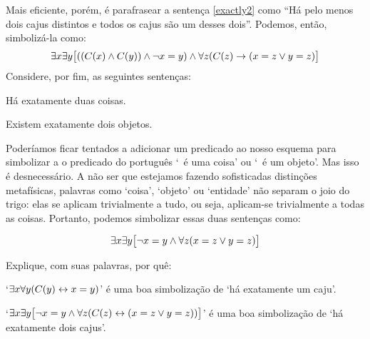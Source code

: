\normalsize
Mais eficiente, porém, é parafrasear a sentença \ref{exactly2} como
``Há pelo menos dois cajus distintos e todos os cajus são um desses dois''.
Podemos, então, simbolizá-la como:
$$\exists x\exists y\bigl[((\mathord{C}(x) \wedge \mathord{C}(y)) \wedge \neg x = y) \wedge \forall z(\mathord{C}(z) \rightarrow ( x= z \vee y = z)\bigr]$$
Considere, por fim, as seguintes sentenças:
\begin{earg}
\item[\ex{exactly2things}] Há exatamente duas coisas.
\item[\ex{exactly2objects}] Existem exatamente dois objetos.
\end{earg}
Poderíamos ficar tentados a adicionar um predicado ao nosso esquema para simbolizar a o predicado do português `\blank\ é uma coisa' ou `\blank\ é um objeto'.
Mas isso é desnecessário.
A não ser que estejamos fazendo sofisticadas distinções metafísicas, palavras 
como `coisa', `objeto' ou `entidade' não separam o joio do trigo:
elas se aplicam trivialmente a tudo, ou seja, aplicam-se trivialmente a todas as coisas.
Portanto, podemos simbolizar essas duas sentenças como:

$$\exists x \exists y \bigl[\neg x = y  \wedge \forall z(x=z \vee y = z)\bigr]$$

\practiceproblems

\problempart\label{e:HaExatamenteSee} Explique, com suas palavras, por quê:
	\begin{ebullet}
		\item   `$\exists x \forall y(\mathord{C}(y) \leftrightarrow x= y)$' é uma boa simbolização de `há exatamente um caju'.
		\item `$\exists x \exists y \bigl[\neg x = y \wedge \forall z(\mathord{C}(z) \leftrightarrow (x= z \vee y = z))\bigr]$' é uma boa simbolização de `há exatamente dois cajus'.
	\end{ebullet}		


